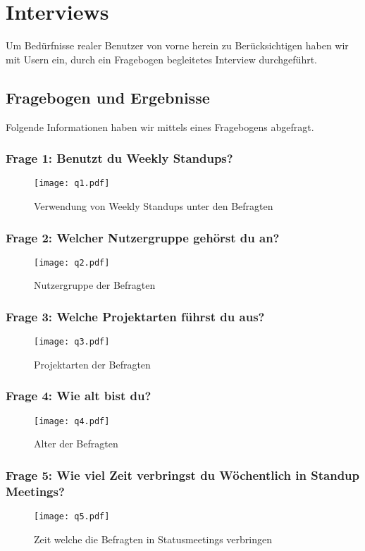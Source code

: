 \chapter{Interviews}

Um Bedürfnisse realer Benutzer von vorne herein zu Berücksichtigen haben wir mit Usern ein, durch ein Fragebogen begleitetes Interview durchgeführt.

\section{Fragebogen und Ergebnisse}

Folgende Informationen haben wir mittels eines Fragebogens abgefragt.

\subsection{Frage 1: Benutzt du Weekly Standups?}
\begin{figure}[H]
	\centering
	\texttt{[image: q1.pdf]}
    \caption{Verwendung von Weekly Standups unter den Befragten}
	\label{fig:q1}
\end{figure}

\subsection{Frage 2: Welcher Nutzergruppe gehörst du an?}
\begin{figure}[H]
	\centering
	\texttt{[image: q2.pdf]}
    \caption{Nutzergruppe der Befragten}
	\label{fig:q2}
\end{figure}
\subsection{Frage 3: Welche Projektarten führst du aus?}
\begin{figure}[H]
	\centering
	\texttt{[image: q3.pdf]}
    \caption{Projektarten der Befragten}
	\label{fig:q3}
\end{figure}
\subsection{Frage 4: Wie alt bist du?} 
\begin{figure}[H]
	\centering
	\texttt{[image: q4.pdf]}
    \caption{Alter der Befragten}
	\label{fig:q4}
\end{figure}     
\subsection{Frage 5: Wie viel Zeit verbringst du Wöchentlich in Standup Meetings?}
\begin{figure}[H]
	\centering
	\texttt{[image: q5.pdf]}
    \caption{Zeit welche die Befragten in Statusmeetings verbringen}
	\label{fig:q5}
\end{figure}  
